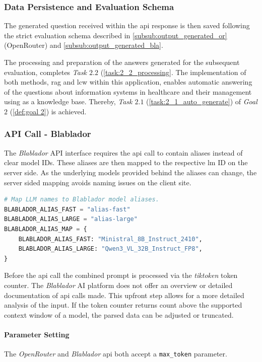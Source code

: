 \subsubsection{Data Persistence and Evaluation Schema}
%
The generated question received within the \ac{api} response is then saved following the strict evaluation schema described in \cref{subsub:output_generated_or} (OpenRouter) and \cref{subsub:output_generated_bla}.

The processing and preparation of the answers generated for the subsequent evaluation, completes \textit{Task $2.2$} (\cref{task:2_2_processing}.
The implementation of both methods, \ac{rag} and \ac{lcw} within this application, enables automatic answering of the questions about information systems in healthcare and their management using \citet{bb2} as a knowledge base.
Thereby, \textit{Task $2.1$} (\cref{task:2_1_auto_generate}) of \textit{Goal $2$} (\cref{def:goal 2}) is achieved.
%
\subsubsection{API Call - Blablador}\label{subsub:api_call_common_bla}

The \textit{Blablador} API interface requires the \ac{api} call to contain aliases instead of clear model IDs.
These aliases are then mapped to the respective \ac{lm} ID on the server side.
As the underlying models provided behind the aliases can change, the server sided mapping avoids naming issues on the client site.
\begin{lstlisting}[language=Python, caption={Mapping of Models Names - App Internal to API}, label={lst:llm_name-mapping_bla}]
# Map LLM names to Blablador model aliases.
BLABLADOR_ALIAS_FAST = "alias-fast"
BLABLADOR_ALIAS_LARGE = "alias-large"
BLABLADOR_ALIAS_MAP = {
    BLABLADOR_ALIAS_FAST: "Ministral_8B_Instruct_2410",
    BLABLADOR_ALIAS_LARGE: "Qwen3_VL_32B_Instruct_FP8",
}
\end{lstlisting}
Before the \ac{api} call the combined prompt is processed via the \textit{tiktoken} token counter.
The \textit{Blablador} AI platform does not offer an overview or detailed documentation of \ac{api} calls made.
This upfront step allows for a more detailed analysis of the input.
If the token counter returns count above the supported context window of a model, the parsed data can be adjusted or truncated.
%
\paragraph{Parameter Setting}
The \textit{OpenRouter} and \textit{Blablador} \ac{api} both accept a \texttt{max\_token} parameter.

